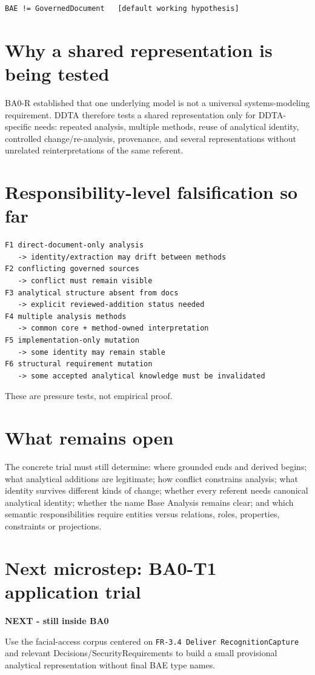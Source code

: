 \documentclass[10pt,a4paper]{article}
\newenvironment{gate}[1]{\def\FrameCommand{\fcolorbox{ddtagreen}{ddtagray}}\MakeFramed{\advance\hsize-2\width\FrameRestore}\noindent\textbf{#1}\par\smallskip}{\endMakeFramed}
\begin{document}
\begin{lstlisting}
BAE != GovernedDocument   [default working hypothesis]
\end{lstlisting}

\section{Why a shared representation is being tested}
BA0-R established that one underlying model is not a universal systems-modeling requirement. DDTA therefore tests a shared representation only for DDTA-specific needs: repeated analysis, multiple methods, reuse of analytical identity, controlled change/re-analysis, provenance, and several representations without unrelated reinterpretations of the same referent.

\newpage
\section{Responsibility-level falsification so far}
\begin{lstlisting}
F1 direct-document-only analysis
   -> identity/extraction may drift between methods
F2 conflicting governed sources
   -> conflict must remain visible
F3 analytical structure absent from docs
   -> explicit reviewed-addition status needed
F4 multiple analysis methods
   -> common core + method-owned interpretation
F5 implementation-only mutation
   -> some identity may remain stable
F6 structural requirement mutation
   -> some accepted analytical knowledge must be invalidated
\end{lstlisting}
These are pressure tests, not empirical proof.

\section{What remains open}
The concrete trial must still determine: where grounded ends and derived begins; what analytical additions are legitimate; how conflict constrains analysis; what identity survives different kinds of change; whether every referent needs canonical analytical identity; whether the name Base Analysis remains clear; and which semantic responsibilities require entities versus relations, roles, properties, constraints or projections.

\section{Next microstep: BA0-T1 application trial}
\begin{gate}{NEXT - still inside BA0}
Use the facial-access corpus centered on \texttt{FR-3.4 Deliver RecognitionCapture} and relevant Decisions/SecurityRequirements to build a small provisional analytical representation without final BAE type names.
\end{gate}
\end{document}

